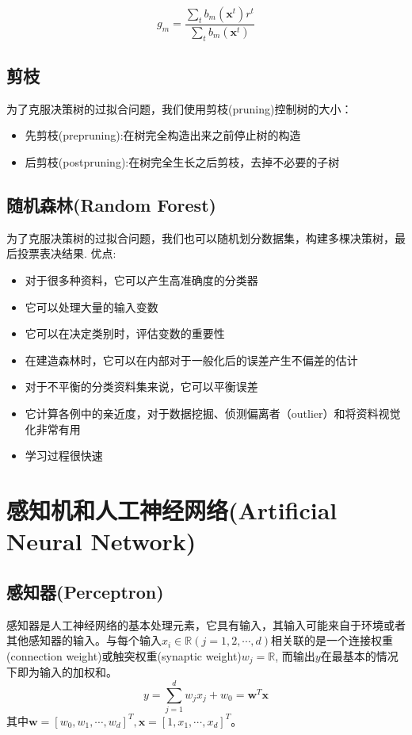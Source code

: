 \documentclass[11pt]{article}
\begin{document}
		\[g_m = \frac{\sum_t b_m(\textbf{x}^t)r^t}{\sum_tb_m(\textbf{x}^t)}\]					
	\subsection{剪枝}
		为了克服决策树的过拟合问题，我们使用剪枝(pruning)控制树的大小：
		\begin{itemize}
			\item 先剪枝(prepruning):在树完全构造出来之前停止树的构造
			\item 后剪枝(postpruning):在树完全生长之后剪枝，去掉不必要的子树
		\end{itemize}
		
	\subsection{随机森林(Random Forest)}
		为了克服决策树的过拟合问题，我们也可以随机划分数据集，构建多棵决策树，最后投票表决结果.
		优点:\begin{itemize}
				\item 对于很多种资料，它可以产生高准确度的分类器
				\item 它可以处理大量的输入变数
				\item 它可以在决定类别时，评估变数的重要性
				\item 在建造森林时，它可以在内部对于一般化后的误差产生不偏差的估计
				\item 对于不平衡的分类资料集来说，它可以平衡误差
				\item 它计算各例中的亲近度，对于数据挖掘、侦测偏离者（outlier）和将资料视觉化非常有用
				\item 学习过程很快速 
			\end{itemize}
			
	\section{感知机和人工神经网络(Artificial Neural Network)}
	\subsection{感知器(Perceptron)}
		感知器是人工神经网络的基本处理元素，它具有输入，其输入可能来自于环境或者其他感知器的输入。与每个输入$x_i \in \mathbb{R}(j = 1, 2, \cdots, d)$相关联的是一个连接权重(connection weight)或触突权重(synaptic weight)$w_j = \mathbb{R}$, 而输出$y$在最基本的情况下即为输入的加权和。
			\[y = \sum_{j = 1}^d w_jx_j + w_0 = \mathbf{w}^T\mathbf{x}\]
			其中$\mathbf{w} = [w_0, w_1, \cdots, w_d]^T, \mathbf{x} = [1, x_1, \cdots, x_d]^T$。
			
\end{document}
